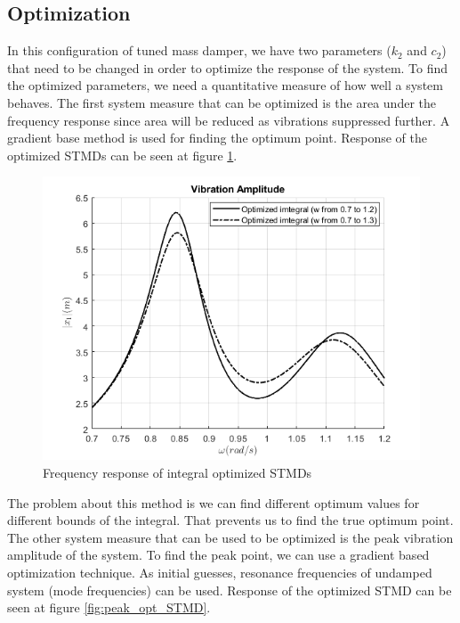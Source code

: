 \subsection{Optimization}
\par In this configuration of tuned mass damper, we have two parameters ($k_2$ and $c_2$) that need to be changed in order to optimize the response of the system. To find the optimized parameters, we need a quantitative measure of how well a system behaves. The first system measure that can be optimized is the area under the frequency response since area will be reduced as vibrations suppressed further. A gradient base method is used for finding the optimum point. Response of the optimized STMDs can be seen at figure \ref{fig:int_opt_STMD}.
\begin{figure}[ht]
    \centering
    \includegraphics[scale=0.5]{MATLAB Figures/integral_optmized_STMD.png}
    \caption{Frequency response of integral optimized STMDs}
    \label{fig:int_opt_STMD}
\end{figure}
\par
The problem about this method is we can find different optimum values for different bounds of the integral. That prevents us to find the true optimum point. The other system measure that can be used to be optimized is the peak vibration amplitude of the system. To find the peak point, we can use a gradient based optimization technique. As initial guesses, resonance frequencies of undamped system (mode frequencies) can be used. Response of the optimized STMD can be seen at figure \ref{fig:peak_opt_STMD}.
